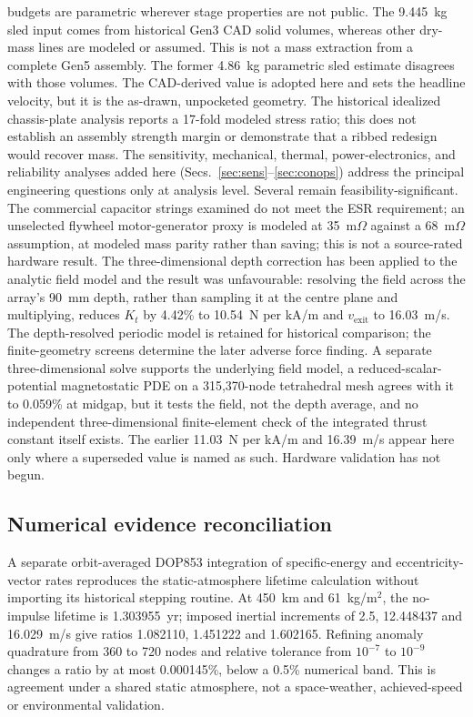 \documentclass[conference]{IEEEtran}
\begin{document}
budgets are parametric wherever stage properties are not public. The 9.445~kg sled input comes from historical Gen3 CAD solid volumes, whereas other dry-mass lines are modeled or assumed. This is not a mass extraction from a complete Gen5 assembly. The former 4.86~kg parametric sled estimate disagrees with those volumes. The CAD-derived value is adopted here and sets the headline velocity, but it is the as-drawn, unpocketed geometry. The historical idealized chassis-plate analysis reports a 17-fold modeled stress ratio; this does not establish an assembly strength margin or demonstrate that a ribbed redesign would recover mass. The sensitivity, mechanical, thermal, power-electronics, and reliability analyses added here (Secs.~\ref{sec:sens}--\ref{sec:conops}) address the principal engineering questions only at analysis level. Several remain feasibility-significant. The commercial capacitor strings examined do not meet the ESR requirement; an unselected flywheel motor-generator proxy is modeled at 35~m$\Omega$ against a 68~m$\Omega$ assumption, at modeled mass parity rather than saving; this is not a source-rated hardware result. The three-dimensional depth correction has been applied to the analytic field model and the result was unfavourable: resolving the field across the array's 90~mm depth, rather than sampling it at the centre plane and multiplying, reduces $K_t$ by 4.42\% to 10.54~N per kA/m and $v_\mathrm{exit}$ to 16.03~m/s. The depth-resolved periodic model is retained for historical comparison; the finite-geometry screens determine the later adverse force finding. A separate three-dimensional solve supports the underlying field model, a reduced-scalar-potential magnetostatic PDE on a 315{,}370-node tetrahedral mesh agrees with it to 0.059\% at midgap, but it tests the field, not the depth average, and no independent three-dimensional finite-element check of the integrated thrust constant itself exists. The earlier 11.03~N per kA/m and 16.39~m/s appear here only where a superseded value is named as such. Hardware validation has not begun.


\subsection{Numerical evidence reconciliation}
A separate orbit-averaged DOP853 integration of specific-energy and eccentricity-vector rates reproduces the static-atmosphere lifetime calculation without importing its historical stepping routine. At 450~km and 61~kg/m$^2$, the no-impulse lifetime is 1.303955~yr; imposed inertial increments of 2.5, 12.448437 and 16.029~m/s give ratios 1.082110, 1.451222 and 1.602165. Refining anomaly quadrature from 360 to 720 nodes and relative tolerance from $10^{-7}$ to $10^{-9}$ changes a ratio by at most 0.000145\%, below a 0.5\% numerical band. This is agreement under a shared static atmosphere, not a space-weather, achieved-speed or environmental validation.
\end{document}

